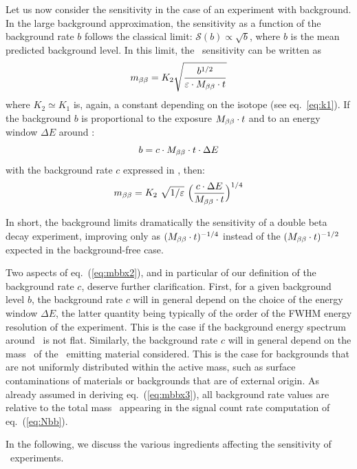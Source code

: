 Let us now consider the sensitivity in the case of an experiment with background. In the large background approximation, the sensitivity as a function of the background rate $b$ follows the classical limit: $\mathcal{S}(b) \propto \sqrt{b}$, where $b$ is the mean predicted background level. In this limit, the \mbb\ sensitivity can be written as
%
\begin{equation}
m_{\beta\beta} =K_{2} \sqrt{\frac{b^{1/2}}{\varepsilon\cdot M_{\beta\beta} \cdot t}} 
\label{eq:mbbx1}
\end{equation}
%
where $K_{2}\simeq K_1$ is, again, a constant depending on the isotope (see eq.~\ref{eq:k1}). If the background $b$ is proportional to the exposure $M_{\beta\beta} \cdot t$ and to an energy window $\Delta E$ around \Qbb :
\begin{equation}
b = c\cdot M_{\beta\beta} \cdot t\cdot \Delta E
\label{eq:mbbx2}
\end{equation}
%
with the background rate $c$ expressed in \ckkbby, then:
%
\begin{equation}
\mbb = K_2  \ \sqrt{1/\varepsilon} \ \Big(\frac{c\cdot \Delta E}{\Mbb \cdot t}\Big)^{1/4} \label{eq:mbbx3}
\end{equation}
%

In short, the background limits dramatically the sensitivity of a double beta decay experiment, improving only as $(M_{\beta\beta} \cdot t)^{-1/4}$ instead of the $(M_{\beta\beta} \cdot t)^{-1/2}$ expected in the background-free case.

Two aspects of eq.~(\ref{eq:mbbx2}), and in particular of our definition of the background rate $c$, deserve further clarification. First, for a given background level $b$, the background rate $c$ will in general depend on the choice of the energy window $\Delta E$, the latter quantity being typically of the order of the FWHM energy resolution of the experiment. This is the case if the background energy spectrum around \Qbb\ is not flat. Similarly, the background rate $c$ will in general depend on the mass \Mbb\ of the \bb\ emitting material considered. This is the case for backgrounds that are not uniformly distributed within the active mass, such as surface contaminations of materials or backgrounds that are of external origin. As already assumed in deriving eq.~(\ref{eq:mbbx3}), all background rate values are relative to the total mass \Mbb\ appearing in the signal count rate computation of eq.~(\ref{eq:Nbb}). 

In the following, we discuss the various ingredients affecting the sensitivity of \bbonu\ experiments.

